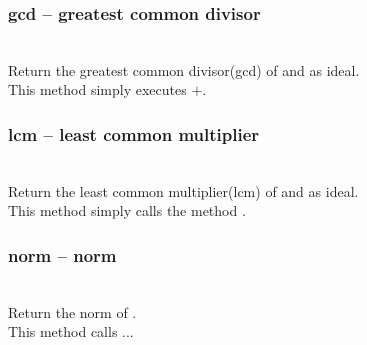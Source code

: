   \subsubsection{gcd -- greatest common divisor}
   \\
   \spacing
   \quad Return the greatest common divisor(gcd) of  and  as ideal.\\
   \spacing
   \quad This method simply executes $+$.\\
   \spacing
  \subsubsection{lcm -- least common multiplier}
   \\
   \spacing
   \quad Return the least common multiplier(lcm) of  and  as ideal.\\
   \spacing
   \quad This method simply calls the method .\\
   \spacing
  \subsubsection{norm -- norm}
   \\
   \spacing
   \quad Return the norm of .\\
   \spacing
   \quad This method calls ...\\
   \spacing
